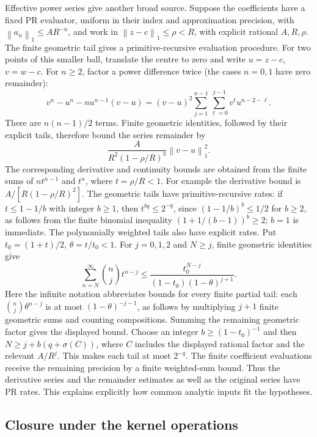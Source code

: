 \documentclass[11pt]{article}
\theoremstyle{definition}
\newcommand{\norm}[1]{\left\lVert#1\right\rVert_1}
\begin{document}
Effective power series give another broad source. Suppose the coefficients
have a fixed PR evaluator, uniform in their index and approximation
precision, with \(\norm{a_n}\le A R^{-n}\), and work in
\(\norm{z-c}\le\rho<R\), with explicit rational \(A,R,\rho\).
The finite geometric tail gives a primitive-recursive evaluation
procedure. For two points of this smaller ball, translate the centre to
zero and write \(u=z-c\), \(v=w-c\). For \(n\ge2\), factor a power
difference twice (the cases \(n=0,1\) have zero remainder):
\[
 v^n-u^n-nu^{n-1}(v-u)
 =(v-u)^2\sum_{j=1}^{n-1}\sum_{\ell=0}^{j-1}
             v^\ell u^{n-2-\ell}.
\]
There are \(n(n-1)/2\) terms. Finite geometric identities, followed by
their explicit tails, therefore bound the series remainder by
\begin{equation}\label{eq:seriesremainder}
 \frac{A}{R^2(1-\rho/R)^3}\norm{v-u}^2.
\end{equation}
The corresponding derivative and continuity bounds are obtained from
the finite sums of \(nt^{n-1}\) and \(t^n\), where \(t=\rho/R<1\).
For example the derivative bound is
\(A/[R(1-\rho/R)^2]\). The geometric tails have primitive-recursive
rates: if \(t\le1-1/b\) with integer \(b\ge1\), then
\(t^{bq}\le2^{-q}\), since
\((1-1/b)^b\le1/2\) for \(b\ge2\), as follows from the finite binomial
inequality \((1+1/(b-1))^b\ge2\); \(b=1\) is immediate.
The polynomially weighted tails also have explicit rates. Put
\(t_0=(1+t)/2\), \(\theta=t/t_0<1\). For \(j=0,1,2\) and \(N\ge j\),
finite geometric identities give
\[
 \sum_{n=N}^{\infty}\binom nj t^{n-j}
 \le\frac{t_0^{N-j}}{(1-t_0)(1-\theta)^{j+1}}.
\]
Here the infinite notation abbreviates bounds for every finite partial
tail: each \(\binom nj\theta^{n-j}\) is at most
\((1-\theta)^{-j-1}\), as follows by multiplying \(j+1\) finite
geometric sums and counting compositions. Summing the remaining
geometric factor gives the displayed bound. Choose an integer
\(b\ge(1-t_0)^{-1}\) and then
\(N\ge j+b(q+\sigma(C))\), where \(C\) includes the displayed rational
factor and the relevant \(A/R^j\). This makes each tail at most
\(2^{-q}\). The finite coefficient evaluations receive the remaining
precision by a finite weighted-sum bound. Thus the derivative series and
the remainder estimates as well as the original series have PR rates.
This explains explicitly how common analytic inputs fit the hypotheses.

\subsection{Closure under the kernel operations}
\end{document}
